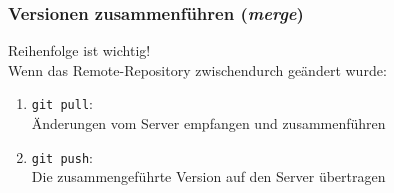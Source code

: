 \documentclass[accentcolor=tud8b,colorbacktitle,inverttitle,landscape,german,presentation,t]{tudbeamer}
\newcommand{\diffn}[1]{\textcolor{darkgreen}{#1}}
\begin{document}
\begin{frame}
			\end{frame}
		
			\begin{frame}
				\frametitle{Versionen zusammenführen (\textit{merge})}
				Reihenfolge ist wichtig!\\ Wenn das Remote-Repository zwischendurch geändert wurde:
				\begin{enumerate}
					\item \texttt{git pull}:\\Änderungen vom Server empfangen und zusammenführen
					\item \texttt{git push}:\\Die zusammengeführte Version auf den Server übertragen
				\end{enumerate}
			\end{frame}
		
	
\end{document}
